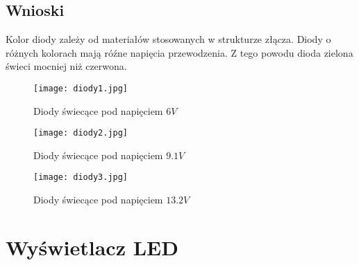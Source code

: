 \documentclass[polish,a4paper]{article}
\begin{document}
\subsection{Wnioski}
Kolor diody zależy od materiałów stosowanych w strukturze złącza. Diody o różnych kolorach mają róźne napięcia przewodzenia. Z tego powodu dioda zielona świeci mocniej niż czerwona.

\begin{figure}[H]
\centering
\texttt{[image: diody1.jpg]}
\caption{Diody świecące pod napięciem $6V$}
\end{figure}

\begin{figure}[H]
\centering
\texttt{[image: diody2.jpg]}
\caption{Diody świecące pod napięciem $9.1V$}
\end{figure}

\begin{figure}[H]
\centering
\texttt{[image: diody3.jpg]}
\caption{Diody świecące pod napięciem $13.2V$}
\end{figure}

\section{Wyświetlacz LED}
\end{document}
